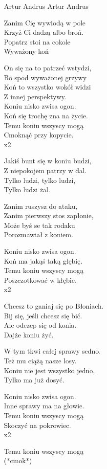 {Artur Andrus}
{Artur Andrus}
\begin{text}
Zanim Cię wywiodą w pole\\
Krzyż Ci dadzą albo broń.\\
Popatrz stoi na cokole\\
Wyważony koń

On się na to patrzeć wstydzi,\\
Bo spod wyważonej grzywy \\
Koń to wszystko wokół widzi\\
Z innej perspektywy.\\

Koniu nisko zwisa ogon.\\
Koń się trochę zna na życie.\\
Temu koniu wszyscy mogą\\
Cmoknąć przy kopycie.\\
x2

Jakiś bunt się w koniu budzi,\\
Z niepokojem patrzy w dal.\\
Tylko ludzi, tylko ludzi,\\
Tylko ludzi żal.

Zanim ruszysz do ataku,\\
Zanim pierwszy stos zapłonie,\\
Może byś se tak rodaku\\
Porozmawiał z koniem.

Koniu nisko zwisa ogon.\\
Koń ma jakąś taką głębię.\\
Temu koniu wszyscy mogą\\
Poszczotkować w kłębie.\\
x2

Chcesz to ganiaj się po Błoniach.\\
Bij się, jeśli chcesz się bić.\\
Ale odczep się od konia.\\
Dajże koniu żyć.

W tym tkwi całej sprawy sedno.\\
Też mu ciążą nasze losy.\\
Koniu nie jest wszystko jedno,\\
Tylko ma już dosyć.

Koniu nisko zwisa ogon.\\
Inne sprawy ma na głowie.\\
Temu koniu wszyscy mogą\\
Skoczyć na pokrowiec.\\
x2

Temu koniu wszyscy mogą\\
(*cmok*)
\end{text}
\begin{chord}
\end{chord}
